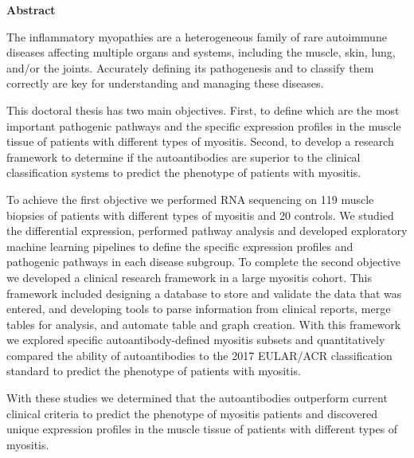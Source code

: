 \cleardoublepage
\thispagestyle{empty}

\begin{center}
    \Large
    \textbf{\thetitle}
    
    \vspace{0.4cm}
    \large
    \textbf{\theauthor}
    
    \vspace{0.4cm}
    \textbf{Abstract}
\end{center}

The inflammatory myopathies are a heterogeneous family of rare autoimmune diseases affecting multiple organs and systems, including the muscle, skin, lung, and/or the joints.  Accurately defining its pathogenesis and to classify them correctly are key for understanding and managing these diseases.

This doctoral thesis has two main objectives. First, to define which are the most important pathogenic pathways and the specific expression profiles in the muscle tissue of patients with different types of myositis. Second, to develop a research framework to determine if the autoantibodies are superior to the clinical classification systems to predict the phenotype of patients with myositis.

To achieve the first objective we performed RNA sequencing on 119 muscle biopsies of patients with different types of myositis and 20 controls. We studied the differential expression, performed pathway analysis and developed exploratory machine learning pipelines to define the specific expression profiles and pathogenic pathways in each disease subgroup. To complete the second objective we developed a clinical research framework in a large myositis cohort. This framework included designing a database to store and validate the data that was entered, and developing tools to parse information from clinical reports, merge tables for analysis, and automate table and graph creation. With this framework we explored specific autoantibody-defined myositis subsets and quantitatively compared the ability of autoantibodies to the 2017 EULAR/ACR classification standard to predict the phenotype of patients with myositis.

With these studies we determined that the autoantibodies outperform current clinical criteria to predict the phenotype of myositis patients and discovered unique expression profiles in the muscle tissue of patients with different types of myositis.
